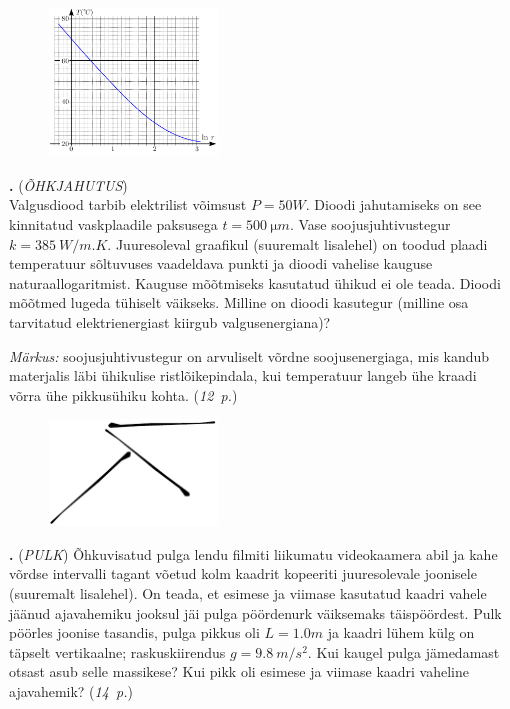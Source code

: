 \documentclass[11pt,a5paper]{article}
\newcommand{\numb}[1]{\vspace{5pt}\textbf{\large #1}}
\newcommand{\nimi}[1]{(\textsl{\small #1})}
\newcommand{\punktid}[1]{(\emph{#1~p.})}
\newcommand{\autor}[1]{}
\newcounter{ylesanne}
\newcommand{\yl}[1]{\addtocounter{ylesanne}{1}\numb{\theylesanne.} \nimi{#1} \newblock{}}
\begin{document}
\begin{figure}
	\vspace{-20pt}
	\begin{center}
		\includegraphics[width = 0.4\textwidth]{BesselK.pdf}
	\end{center}
\end{figure}

\yl{ÕHKJAHUTUS}\\
Valgusdiood tarbib elektrilist võimsust $P=\SI{50}W$. Dioodi jahutamiseks on see kinnitatud vaskplaadile paksusega $t=\SI{500}{\micro m}$. Vase soojusjuhtivustegur $k=\SI{385}{W/m.K}$. Juuresoleval graafikul (suuremalt lisalehel) on toodud plaadi temperatuur sõltuvuses vaadeldava punkti ja dioodi vahelise kauguse naturaallogaritmist. Kauguse mõõtmiseks kasutatud ühikud ei ole teada. Dioodi mõõtmed lugeda tühiselt väikseks. Milline on dioodi kasutegur (milline osa tarvitatud elektrienergiast kiirgub valgusenergiana)?

\textit{Märkus:} soojusjuhtivustegur on arvuliselt võrdne soojusenergiaga, mis kandub materjalis läbi ühikulise ristlõikepindala, kui temperatuur langeb ühe kraadi võrra ühe pikkusühiku kohta.
\punktid{12}\autor{Jaan Kalda}



\begin{figure}
	\vspace{-25pt}
	\begin{center}
		\includegraphics[width = 0.4\textwidth]{pulk.pdf}
	\end{center}
\end{figure}

\yl{PULK}
Õhkuvisatud pulga lendu filmiti liikumatu videokaamera abil ja kahe võrdse intervalli tagant võetud kolm kaadrit kopeeriti juuresolevale joonisele (suuremalt lisalehel). On teada, et esimese ja viimase kasutatud kaadri vahele jäänud ajavahemiku jooksul jäi pulga pöördenurk väiksemaks täispöördest. Pulk pöörles joonise tasandis, pulga pikkus oli $L=\SI{1.0}m$ ja kaadri lühem külg on täpselt vertikaalne; raskuskiirendus $g=\SI{9.8}{m/s^2}$. Kui kaugel pulga jämedamast otsast asub selle massikese? Kui pikk oli esimese ja viimase kaadri vaheline ajavahemik?
\punktid{14}\autor{Jaan Kalda}
\end{document}
